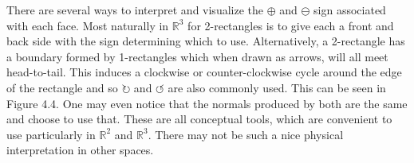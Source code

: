 \begin{figure}[h]
\end{figure}

There are several ways to interpret and visualize the $\oplus$ and $\ominus$ sign associated with each face.
Most naturally in $\mathbb{R}^3$ for 2-rectangles is to give each a front and back side with the sign determining which to use.
Alternatively, a 2-rectangle has a boundary formed by 1-rectangles which when drawn as arrows, will all meet head-to-tail.
This induces a clockwise or counter-clockwise cycle around the edge of the rectangle and so $\circlearrowright$ and $\circlearrowleft$ are also commonly used.
This can be seen in Figure 4.4.
One may even notice that the normals produced by both are the same and choose to use that.
These are all conceptual tools, which are convenient to use particularly in $\mathbb{R}^2$ and $\mathbb{R}^3$.
There may not be such a nice physical interpretation in other spaces.


